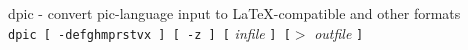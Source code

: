 %
%
% 
% 
% 
% 
% 
%
%
dpic - convert pic-language input to LaTeX-compatible and other formats
{\tt dpic\ [\ -defghmprstvx\ ]\ [\ -z\ ]\ [}
{\it infile}
{\tt ]\ [$>$}
{\it outfile}
{\tt ]}

